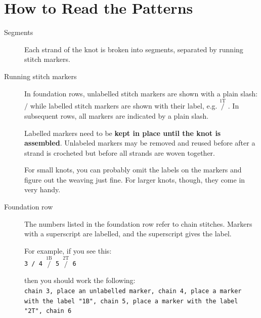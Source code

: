 \documentclass[openany]{book}
\newcommand{\m}[1]{$\stackrel{{\text{#1}}}{/}$}
\begin{document}
\section{How to Read the Patterns}\label{sec:reading}
\begin{description}
\item[Segments] Each strand of the knot is broken into segments, separated by running stitch markers. 
\item[Running stitch markers] 
 In foundation rows, unlabelled stitch markers are shown with a plain slash: \quad \m{}  \quad while labelled stitch markers are shown with their label, e.g. \quad \m{1T} \quad. In subsequent rows, all markers are indicated by a plain slash.

Labelled markers need to be \textbf{kept in place until the knot is assembled}. Unlabeled markers may be removed and reused before after a strand is crocheted but before all strands are woven together.
%
%
%
%
%

For small knots, you can probably omit the labels on the markers and figure out the weaving just fine. For larger knots, though, they come in very handy.

\item[Foundation row] The numbers listed in the foundation row refer to chain stitches. Markers with a superscript are labelled, and the superscript gives the label.
 
 For example, if you see this:\\
 
 \texttt{3 / 4 \m{1B} 5 \m{2T}  6}
 
 then you should work the following:\\
 
 \texttt{chain 3, place an unlabelled marker, chain 4, place a  marker with the label "1B", chain 5, place a  marker with the label "2T", chain 6}
 



\end{description}
\end{document}
